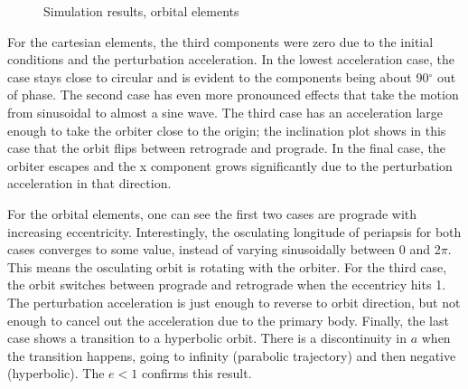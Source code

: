 \documentclass[]{aiaa-tc}%
\begin{document}
\begin{figure}[H]
{		}
	\caption{Simulation results, orbital elements }
		\label{fig:P14_OE}
	\end{figure}	

For the cartesian elements, the third components were zero due to the initial conditions and the perturbation acceleration. In the lowest acceleration case, the case stays close to circular and is evident to the components being about 90$^\circ$ out of phase. The second case has even more pronounced effects that take the motion from sinusoidal to almost a sine wave. The third case has an acceleration large enough to take the orbiter close to the origin; the inclination plot shows in this case that the orbit flips between retrograde and prograde.  In the final case, the orbiter escapes and the x component grows significantly due to the perturbation acceleration in that direction.

For the orbital elements, one can see the first two cases are prograde with increasing eccentricity. Interestingly, the osculating longitude of periapsis for both cases converges to some value, instead of varying sinusoidally between 0 and 2$\pi$. This means the osculating orbit is rotating with the orbiter. For the third case, the orbit switches between prograde and retrograde when the eccentricy hits 1. The perturbation acceleration is just enough to reverse to orbit direction, but not enough to cancel out the acceleration due to the primary body. Finally, the last case shows a transition to a hyperbolic orbit. There is a discontinuity in $a$ when the transition happens, going to infinity (parabolic trajectory) and then negative (hyperbolic). The $e<1$ confirms this result. 
\end{document}
